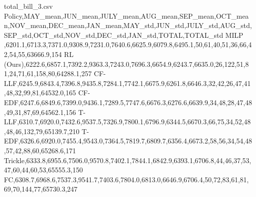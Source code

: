 
\begin{filecontents}{total_bill_3.csv}
Policy,MAY_mean,JUN_mean,JULY_mean,AUG_mean,SEP_mean,OCT_mean,NOV_mean,DEC_mean,JAN_mean,MAY_std,JUN_std,JULY_std,AUG_std,SEP_std,OCT_std,NOV_std,DEC_std,JAN_std,TOTAL,TOTAL_std
MILP ,6201.1,6713.3,7371.0,9308.9,7231.0,7640.6,6625.9,6079.8,6495.1,50,61,40,51,36,66,42,54,55,63666.9,154
RL (Ours),6222.6,6857.1,7392.2,9363.3,7243.0,7696.3,6654.9,6243.7,6635.0,26,122,51,81,24,71,61,158,80,64288.1,257
CF-LLF,6245.9,6843.4,7396.8,9435.8,7284.1,7742.1,6675.9,6261.8,6646.3,32,42,26,47,41,48,32,99,81,64532.0,165
CF-EDF,6247.6,6849.6,7399.0,9436.1,7289.5,7747.6,6676.3,6276.6,6639.9,34,48,28,47,48,49,31,87,69,64562.1,156
T-LLF,6310.7,6920.0,7432.6,9537.5,7326.9,7800.1,6796.9,6344.5,6670.3,66,75,34,52,48,48,46,132,79,65139.7,210
T-EDF,6326.6,6920.0,7455.4,9543.0,7364.5,7819.7,6809.7,6356.4,6673.2,58,56,34,54,48,57,42,88,60,65268.6,171
Trickle,6333.8,6955.6,7506.0,9570.8,7402.1,7844.1,6842.9,6393.1,6706.8,44,46,37,53,47,60,44,60,53,65555.3,150
FC,6308.7,6968.6,7537.3,9541.7,7403.6,7804.0,6813.0,6646.9,6706.4,50,72,83,61,81,69,70,144,77,65730.3,247


\end{filecontents}

